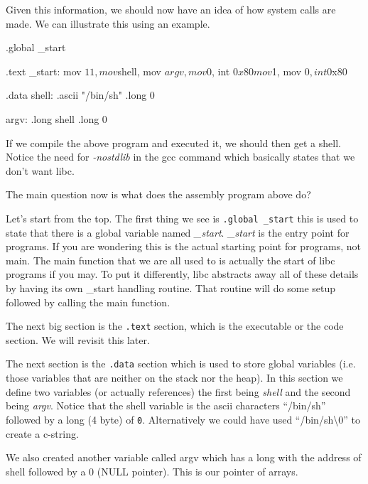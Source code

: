 Given this information, we should now have an idea of how system calls are made. We can illustrate this using an example. 

\begin{code}
.global _start

.text
_start:
  mov $11, %
  mov $shell, %
  mov $argv, %
  mov $0, %
  int $0x80

  mov $1, %
  mov $0, %
  int $0x80

.data
shell:
  .ascii "/bin/sh"
  .long 0

argv:
  .long shell
  .long 0
\end{code}

If we compile the above program and executed it, we should then get a shell. Notice the need for {\em -nostdlib} in the gcc command which basically states that we don’t want libc. 


The main question now is what does the assembly program above do?

Let’s start from the top. The first thing we see is {\tt .global \_start} this is used to state that there is a global variable named {\em \_start}. {\em \_start} is the entry point for programs. If you are wondering this is the actual starting point for programs, not main. The main function that we are all used to is actually the start of libc programs if you may. To put it differently, libc abstracts away all of these details by having its own \_start handling routine. That routine will do some setup followed by calling the main function. 

The next big section is the {\tt .text} section, which is the executable or the code section. We will revisit this later. 

The next section is the {\tt .data} section which is used to store global variables (i.e. those variables that are neither on the stack nor the heap). In this section we define two variables (or actually references) the first being {\em shell} and the second being {\em argv}. Notice that the shell variable is the ascii characters ``/bin/sh'' followed by a long (4 byte) of {\tt 0}. Alternatively we could have used ``/bin/sh\textbackslash 0'' to create a c-string.

We also created another variable called argv which has a long with the address of shell followed by a 0 (NULL pointer). This is our pointer of arrays.

